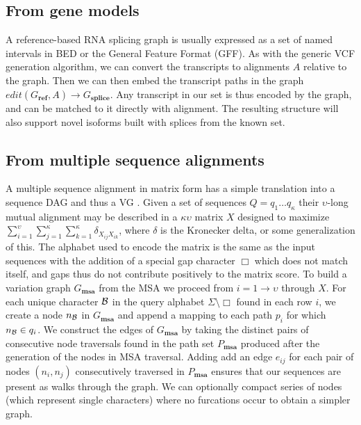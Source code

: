 \subsection{From gene models} %
\label{sec:construct_from_gff}

A reference-based RNA splicing graph is usually expressed as a set of named intervals in BED or the General Feature Format (GFF).
As with the generic VCF generation algorithm, we can convert the transcripts to alignments $A$ relative to the graph.
Then we can then embed the transcript paths in the graph $edit(G_\textbf{ref}, A) \to G_\textbf{splice}$.
Any transcript in our set is thus encoded by the graph, and can be matched to it directly with alignment.
The resulting structure will also support novel isoforms built with splices from the known set.

\subsection{From multiple sequence alignments}
A multiple sequence alignment in matrix form has a simple translation into a sequence DAG and thus a VG \cite{lee2002POA}.
Given a set of sequences $Q = q_1 \ldots q_\kappa$ their $\upsilon$-long mutual alignment may be described in a $\kappa \upsilon$ matrix $X$ designed to maximize $\sum_{i=1}^{\upsilon} \sum_{j=1}^{\kappa} \sum_{k=1}^{\kappa} \delta_{X_{ij}X_{ik}}$, where $\delta$ is the Kronecker delta, or some generalization of this.
The alphabet used to encode the matrix is the same as the input sequences with the addition of a special gap character $\Box$ which does not match itself, and gaps thus do not contribute positively to the matrix score.
To build a variation graph $G_\textbf{msa}$ from the MSA we proceed from $i = 1 \to \upsilon$ through $X$.
For each unique character ${\cal B}$ in the query alphabet $\Sigma \setminus \Box$ found in each row $i$, we create a node $n_{\cal B}$ in $G_\textbf{msa}$ and append a mapping to each path $p_i$ for which $n_{\cal B} \in q_i$.
We construct the edges of $G_\textbf{msa}$ by taking the distinct pairs of consecutive node traversals found in the path set $P_\textbf{msa}$ produced after the generation of the nodes in MSA traversal.
Adding add an edge $e_{ij}$ for each pair of nodes $(n_i, n_j)$ consecutively traversed in $P_\textbf{msa}$ ensures that our sequences are present as walks through the graph.
We can optionally compact series of nodes (which represent single characters) where no furcations occur to obtain a simpler graph.

